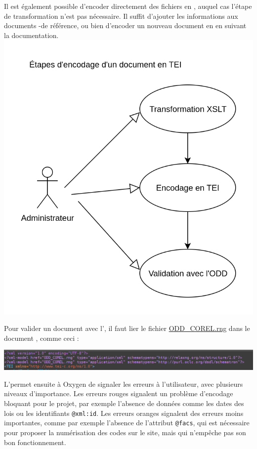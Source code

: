 Il est également possible d’encoder directement des fichiers en \TEI, auquel cas l’étape de transformation \XSL n’est pas nécessaire. Il suffit d’ajouter les informations aux documents \XML-\TEI de référence, ou bien d’encoder un nouveau document en \TEI en suivant la documentation. 
\newpage
\noindent \includegraphics[width=\textwidth]{images/annexe16.png}

Pour valider un document avec l’\ODD, il faut lier le fichier \href{https://sharedocs.huma-num.fr/wl/?id=yHHcUPKWyusazIZqWVLgtbZI7J65OaLA&path=ODD%2Fout&mode=grid}{ODD_COREL.rng} dans le document \TEI, comme ceci : 

\noindent \includegraphics[width=\textwidth]{images/annexe17.png}

L’\ODD permet ensuite à Oxygen de signaler les erreurs à l’utilisateur, avec plusieurs niveaux d’importance. Les erreurs rouges signalent un problème d’encodage bloquant pour le projet, par exemple l’absence de données comme les dates des lois ou les identifiants \texttt{@xml:id}. Les erreurs oranges signalent des erreurs moins importantes, comme par exemple l’absence de l’attribut \texttt{@facs}, qui est nécessaire pour proposer la numérisation des codes sur le site, mais qui n’empêche pas son bon fonctionnement.
\newpage

